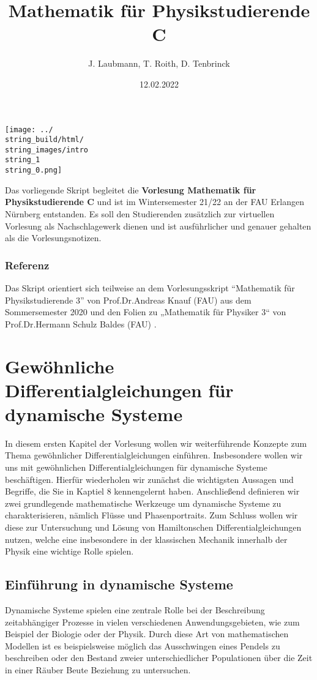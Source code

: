 \documentclass[letterpaper,10pt,german]{jupyterBook}
\title{Mathematik für Physikstudierende C}
\date{12.02.2022}
\author{J.\@{} Laubmann, T.\@{} Roith, D.\@{} Tenbrinck}
\begin{document}
\label{\detokenize{intro::doc}}



\noindent\texttt{[image: ../\\string\_build/html/\\string\_images/intro\\string\_1\\string\_0.png]}


\par
Das vorliegende Skript begleitet die \textbf{Vorlesung Mathematik für Physikstudierende C} und ist im Wintersemester 21/22 an der FAU Erlangen Nürnberg entstanden. Es soll den Studierenden zusätzlich zur virtuellen Vorlesung als Nachschlagewerk dienen und ist ausführlicher und genauer gehalten als die Vorlesungsnotizen.

\subsection{Referenz}

\par
Das Skript orientiert sich teilweise an dem Vorlesungsskript “Mathematik für Physikstudierende 3” \cite{Kna20} von Prof.Dr.Andreas Knauf (FAU) aus dem Sommersemester 2020 und den Folien zu „Mathematik für Physiker 3“ von Prof.Dr.Hermann Schulz Baldes (FAU) \cite{SB18}.


\chapter{Gewöhnliche Differentialgleichungen für dynamische Systeme}
\label{\detokenize{ode/ode:gewohnliche-differentialgleichungen-fur-dynamische-systeme}}\label{\detokenize{ode/ode::doc}}
\par
In diesem ersten Kapitel der Vorlesung wollen wir weiterführende Konzepte zum Thema gewöhnlicher Differentialgleichungen einführen.
Insbesondere wollen wir uns mit gewöhnlichen Differentialgleichungen für dynamische Systeme beschäftigen.
Hierfür wiederholen wir zunächst die wichtigsten Aussagen und Begriffe, die Sie in Kaptiel 8 \cite{Ten21} kennengelernt haben.
Anschließend definieren wir zwei grundlegende mathematische Werkzeuge um dynamische Systeme zu charakterisieren, nämlich Flüsse und Phasenportraits.
Zum Schluss wollen wir diese zur Untersuchung und Lösung von Hamiltonschen Differentialgleichungen nutzen, welche eine insbesondere in der klassischen Mechanik innerhalb der Physik eine wichtige Rolle spielen.


\section{Einführung in dynamische Systeme}
\label{\detokenize{ode/dynamicSystems:einfuhrung-in-dynamische-systeme}}\label{\detokenize{ode/dynamicSystems::doc}}
\par
Dynamische Systeme spielen eine zentrale Rolle bei der Beschreibung zeitabhängiger Prozesse in vielen verschiedenen Anwendungsgebieten, wie zum Beispiel der Biologie oder der Physik.
Durch diese Art von mathematischen Modellen ist es beispielsweise möglich das Ausschwingen eines Pendels zu beschreiben oder den Bestand zweier unterschiedlicher Populationen über die Zeit in einer Räuber Beute Beziehung zu untersuchen.
\end{document}
